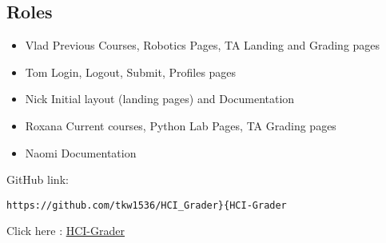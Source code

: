 \subsection{Roles}


\begin{itemize}
  \item {Vlad} Previous Courses, Robotics Pages, TA Landing and Grading pages
  \item {Tom} Login, Logout, Submit, Profiles pages
  \item {Nick} Initial layout (landing pages) and Documentation
  \item {Roxana} Current courses, Python Lab Pages, TA Grading pages
  \item{Naomi} Documentation
\end{itemize}

GitHub link:
\begin{verbatim}
https://github.com/tkw1536/HCI_Grader}{HCI-Grader
\end{verbatim}
Click here : \href{https://github.com/tkw1536/HCI_Grader}{HCI-Grader}
